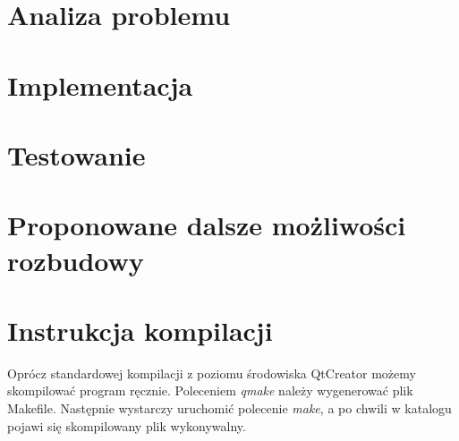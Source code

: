 \documentclass[12pt]{article}
\begin{document}
\section{Analiza problemu}

\section{Implementacja}


\section{Testowanie}
\section{Proponowane dalsze możliwości rozbudowy}

\section{Instrukcja kompilacji}
Oprócz standardowej kompilacji z poziomu środowiska QtCreator możemy skompilować program ręcznie. Poleceniem \textit{qmake} należy wygenerować plik Makefile. Następnie wystarczy uruchomić polecenie \textit{make}, a po chwili w katalogu pojawi się skompilowany plik wykonywalny.
\end{document}
